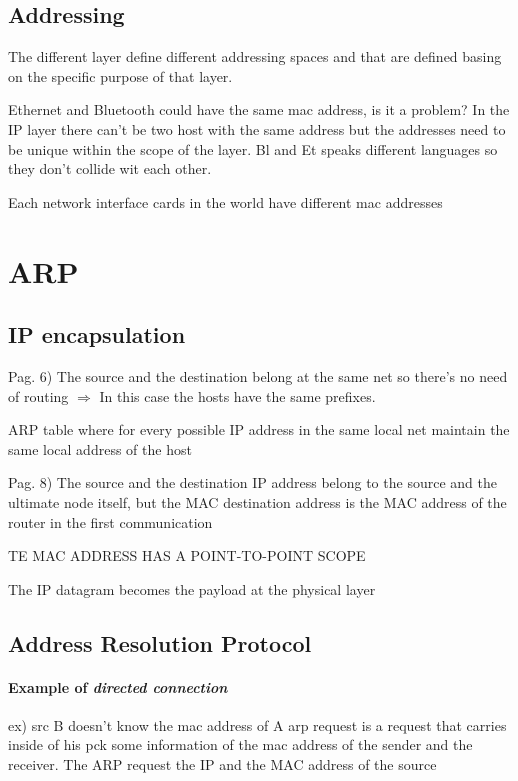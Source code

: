 \subsection{Addressing}

The different layer define different addressing spaces and that are defined basing on the specific purpose of that layer.

Ethernet and Bluetooth could have the same mac address, is it a problem? In the IP layer there can't be two host with the same address but the addresses need to be unique within the scope of the layer. Bl and Et speaks different languages so they don't collide wit each other.

Each network interface cards in the world have different mac addresses

\section{ARP}
\subsection{IP encapsulation}

Pag. 6) The source and the destination belong at the same net so there's no need of routing $\Rightarrow$ In this case the hosts have the same prefixes. 

ARP table where for every possible IP address in the same local net maintain the same local address of the host

Pag. 8) The source and the destination IP address belong to the source and the ultimate node itself, but the MAC destination address is the MAC address of the router in the first communication

TE MAC ADDRESS HAS A POINT-TO-POINT SCOPE

The IP datagram becomes the payload at the physical layer

\subsection{Address Resolution Protocol}
\paragraph{Example of \emph{directed connection}}
ex) src B doesn't know the mac address of A
arp request is a request that carries inside of his pck some information of the mac address of the sender and the receiver.
The ARP request the IP and the MAC address of the source

